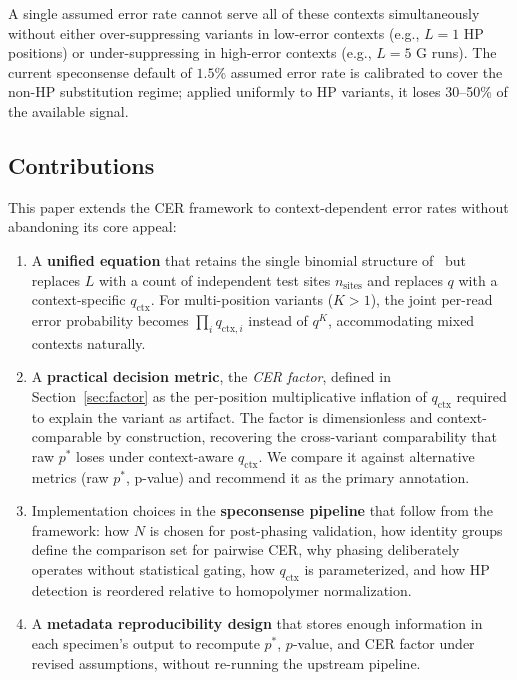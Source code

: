 \documentclass[11pt]{article}
\begin{document}
A single assumed error rate cannot serve all of these contexts simultaneously
without either over-suppressing variants in low-error contexts (e.g., $L = 1$ HP
positions) or under-suppressing in high-error contexts (e.g., $L = 5$ G runs).
The current speconsense default of $1.5\%$ assumed error rate is calibrated to
cover the non-HP substitution regime; applied uniformly to HP variants, it
loses 30--50\% of the available signal.

\subsection{Contributions}

This paper extends the CER framework to context-dependent error rates without
abandoning its core appeal:

\begin{enumerate}
\item A \textbf{unified equation} that retains the single binomial structure
of~\cite{cer_paper} but replaces $L$ with a count of independent test sites
$n_\text{sites}$ and replaces $q$ with a context-specific $q_\text{ctx}$.
For multi-position variants ($K > 1$), the joint per-read error probability
becomes $\prod_i q_{\text{ctx},i}$ instead of $q^K$, accommodating mixed
contexts naturally.

\item A \textbf{practical decision metric}, the \emph{CER factor}, defined
in Section~\ref{sec:factor} as the per-position multiplicative inflation of
$q_\text{ctx}$ required to explain the variant as artifact. The factor is
dimensionless and context-comparable by construction, recovering the
cross-variant comparability that raw $p^*$ loses under context-aware
$q_\text{ctx}$. We compare it against alternative metrics (raw $p^*$,
p-value) and recommend it as the primary annotation.

\item Implementation choices in the \textbf{speconsense pipeline} that follow
from the framework: how $N$ is chosen for post-phasing validation, how
identity groups define the comparison set for pairwise CER, why phasing
deliberately operates without statistical gating, how $q_\text{ctx}$ is
parameterized, and how HP detection is reordered relative to homopolymer
normalization.

\item A \textbf{metadata reproducibility design} that stores enough information
in each specimen's output to recompute $p^*$, $p$-value, and CER factor under
revised assumptions, without re-running the upstream pipeline.
\end{enumerate}
\end{document}
